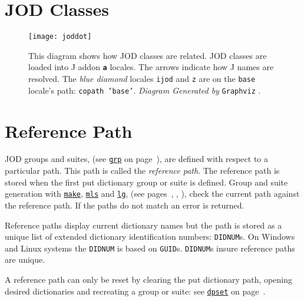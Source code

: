     
     
   \newpage
   \section{JOD Classes}\label{ap:classes}
   
   \begin{figure}[htbp]
  \centering
  \texttt{[image: joddot]}
  \caption[JOD Classes]{This diagram shows how 
    JOD classes are related. JOD classes are loaded into 
    J addon \textbf{\texttt{a}} locales. The arrows indicate how J names are resolved.
    The \emph{blue diamond} locales \texttt{ijod} and \texttt{z} are on the \texttt{base} locale's 
    path: \texttt{copath 'base'}. \emph{Diagram Generated by} \texttt{Graphviz} \cite{jwiki:graphviz}.    
    }
   \label{eps:joddot}
   \end{figure}
   
   \newpage
   \section{Reference Path}\label{ap:refpath}
   
   JOD groups and suites, (see \hyperlink{il:grp}{\texttt{grp}} on page~\pageref{ss:grp}), are defined with respect to a particular path.  This path is called the \emph{reference path}.  The reference path is stored when the first put dictionary group or 
suite is defined.   Group and suite generation with \hyperlink{il:make}{\texttt{make}}, \hyperlink{il:mls}{\texttt{mls}} and  \hyperlink{il:lg}{\texttt{lg}}, (see pages~\pageref{ss:make}, \pageref{ss:mls}, \pageref{ss:lg}), check the current path against the reference path.  If the paths do not match an error is returned.

Reference paths display current dictionary names but the path is 
stored as a unique list of extended dictionary 
identification numbers: \texttt{DIDNUM}s.  On Windows and Linux 
systems the \texttt{DIDNUM} is based 
on \texttt{GUID}s.  \texttt{DIDNUM}s insure reference paths are unique.


A reference path can only be reset by clearing the put dictionary
 path, opening desired dictionaries and recreating a group or suite: see \hyperlink{il:dpset}{\texttt{dpset}} on page~\pageref{ss:dpset}.

